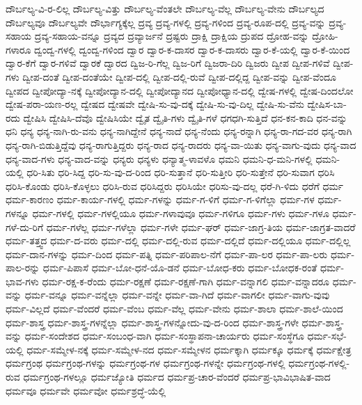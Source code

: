 {ದೌರ್ಬಲ್ಯ-ವಿ-ರ-ಲಿಲ್ಲ
ದೌರ್ಬಲ್ಯ-ವಿತ್ತು
ದೌರ್ಬಲ್ಯ-ವೆಂತಲೇ
ದೌರ್ಬಲ್ಯ-ವೆಲ್ಲ
ದೌರ್ಬಲ್ಯ-ವೇನು
ದೌರ್ಬಲ್ಯದ
ದೌರ್ಬಲ್ಯವೂ
ದೌರ್ಬಲ್ಯವೇ
ದೌರ್ಭಾಗ್ಯಕ್ಕೆಲ್ಲ
ದ್ರವ್ಯ
ದ್ರವ್ಯ-ಗಳಲ್ಲಿ
ದ್ರವ್ಯ-ಗಳಿಂದ
ದ್ರವ್ಯ-ರೂಪ-ದಲ್ಲಿ
ದ್ರವ್ಯ-ವನ್ನು
ದ್ರವ್ಯ-ಸಹಾಯ
ದ್ರವ್ಯ-ಸಹಾಯ-ವನ್ನೂ
ದ್ರವ್ಯದ
ದ್ರವ್ಯಾರ್ಜನೆ
ದ್ರಷ್ಟರು
ದ್ರಾಕ್ಷಿ
ದ್ರಾಕ್ಷಿಯ
ದ್ರುಪದ
ದ್ರೋಹ-ವನ್ನು
ದ್ರೋಹಿ-ಗಳಾರೂ
ದ್ವಂದ್ವ-ಗಳಲ್ಲಿ
ದ್ವಂದ್ವ-ಗಳಿಂದ
ದ್ವಾರ
ದ್ವಾರ-ಕ-ದಾಸರ
ದ್ವಾರ-ಕ-ದಾಸರು
ದ್ವಾರ-ಕೆ-ಯಲ್ಲಿ
ದ್ವಾರ-ಕೆ-ಯಿಂದ
ದ್ವಾರ-ಕೆಗೆ
ದ್ವಾರ-ಗಳಿವೆ
ದ್ವಾರಕೆ
ದ್ವಾರದ
ದ್ವಿಜ-ರಿ-ಗೆಲ್ಲ
ದ್ವಿಜ-ರಿಗೆ
ದ್ವಿಜರಾ-ದಿರಿ
ದ್ವಿಜರು
ದ್ವೀಪ
ದ್ವೀಪ-ಗಳಿವೆ
ದ್ವೀಪ-ಗಳು
ದ್ವೀಪ-ದಂತೆ
ದ್ವೀಪ-ದಂತೆಯೇ
ದ್ವೀಪ-ದಲ್ಲಿ
ದ್ವೀಪ-ದಲ್ಲಿ-ರುವೆ
ದ್ವೀಪ-ದಲ್ಲಿದ್ದ
ದ್ವೀಪ-ವನ್ನು
ದ್ವೀಪ-ವೆಂದೂ
ದ್ವೀಪದ
ದ್ವೀಪೋದ್ಯಾ-ನಕ್ಕೆ
ದ್ವೀಪೋದ್ಯಾನ-ದಲ್ಲಿ
ದ್ವೀಪೋದ್ಯಾನದ
ದ್ವೀಪೋಧ್ಯಾನ-ದಲ್ಲಿ
ದ್ವೇಷ-ಗಳಲ್ಲಿ
ದ್ವೇಷ-ದಿಂದಲೋ
ದ್ವೇಷ-ಪರಾ-ಯಣ-ರಲ್ಲ
ದ್ವೇಷದ
ದ್ವೇಷವೇ
ದ್ವೇಷಿ-ಸು-ವು-ದಕ್ಕೆ
ದ್ವೇಷಿ-ಸು-ವು-ದಿಲ್ಲ
ದ್ವೇಷಿ-ಸು-ವೆನು
ದ್ವೇಷಿಸ-ಬಾ-ರದು
ದ್ವೇಷಿಸಿ
ದ್ವೇಷಿಸಿ-ದೆವೊ
ದ್ವೇಷಿಸಿಯೇ
ದ್ವೈತ
ದ್ವೈತಿ-ಗಳು
ದ್ವೈತಿ-ಗಳೆ
ಧಗಧಗಿ-ಸುತ್ತಿದೆ
ಧನ-ಕನ-ಕಾದಿ
ಧನ-ವನ್ನು
ಧನಿ
ಧನ್ಯ
ಧನ್ಯ-ನಾಗಿ-ರು-ವನು
ಧನ್ಯ-ನಾಗಿದ್ದೇನೆ
ಧನ್ಯ-ನಾದೆ
ಧನ್ಯ-ನೆಂದು
ಧನ್ಯ-ರನ್ನಾಗಿ
ಧನ್ಯ-ರಾ-ಗದ-ವರ
ಧನ್ಯ-ರಾಗಿ
ಧನ್ಯ-ರಾಗಿ-ಬಿಡುತ್ತಿದ್ದೆವು
ಧನ್ಯ-ರಾಗುತ್ತಿದ್ದರು
ಧನ್ಯ-ರಾದ
ಧನ್ಯ-ರಾದರು
ಧನ್ಯ-ವಾ-ಯಿತು
ಧನ್ಯ-ವಾಗು-ವುದು
ಧನ್ಯ-ವಾದ
ಧನ್ಯ-ವಾದ-ಗಳು
ಧನ್ಯ-ವಾದ-ವನ್ನು
ಧನ್ಯರು
ಧನ್ಯಳು
ಧನ್ಯಾತ್ಮ-ಳಾವಳೊ
ಧಮನಿ
ಧಮನಿ-ಧ-ಮನಿ-ಗಳಲ್ಲಿ
ಧಮನಿ-ಯಲ್ಲಿ
ಧರಿ-ಸಿತು
ಧರಿ-ಸಿದ್ದ
ಧರಿ-ಸು-ವು-ದ-ರಿಂದ
ಧರಿ-ಸುತ್ತಾನೆ
ಧರಿ-ಸುತ್ತೀರಿ
ಧರಿ-ಸುತ್ತೇನೆ
ಧರಿ-ಸುವಾಗ
ಧರಿಸಿ
ಧರಿಸಿ-ಕೊಂಡು
ಧರಿಸಿ-ಕೊಳ್ಳಲು
ಧರಿಸಿ-ರುವ
ಧರಿಸಿದ್ದರು
ಧರಿಸಿಯೇ
ಧರಿಸು-ವು-ದಲ್ಲ
ಧರೆ-ಗಿ-ಳಿದು
ಧರೆಗೆ
ಧರ್ಮ
ಧರ್ಮ-ಕಾರಣಂ
ಧರ್ಮ-ಕಾರ್ಯ-ಗಳಲ್ಲಿ
ಧರ್ಮ-ಗಳನ್ನು
ಧರ್ಮ-ಗ-ಳಿಗೆ
ಧರ್ಮ-ಗ-ಳಿಗೆಲ್ಲಾ
ಧರ್ಮ-ಗಳ
ಧರ್ಮ-ಗಳನ್ನೂ
ಧರ್ಮ-ಗಳಲ್ಲಿ
ಧರ್ಮ-ಗಳಲ್ಲಿಯೂ
ಧರ್ಮ-ಗಳಾವುವೂ
ಧರ್ಮ-ಗಳಿಗೂ
ಧರ್ಮ-ಗಳು
ಧರ್ಮ-ಗಳೂ
ಧರ್ಮ-ಗಳೆ-ದು-ರಿಗೆ
ಧರ್ಮ-ಗಳೆಲ್ಲ
ಧರ್ಮ-ಗಳೆಲ್ಲಾ
ಧರ್ಮ-ಗಳೇ
ಧರ್ಮ-ಘರ್
ಧರ್ಮ-ಜಾಗ್ರ-ತಿಯ
ಧರ್ಮ-ಜಾಗ್ರತ-ವಾದರೆ
ಧರ್ಮ-ತತ್ತ್ವದ
ಧರ್ಮ-ದ-ವರು
ಧರ್ಮ-ದಲ್ಲಿ
ಧರ್ಮ-ದಲ್ಲಿ-ರುವ
ಧರ್ಮ-ದಲ್ಲಿದೆ
ಧರ್ಮ-ದಲ್ಲಿಯೂ
ಧರ್ಮ-ದಲ್ಲಿಲ್ಲ
ಧರ್ಮ-ದಾನ-ಗಳನ್ನು
ಧರ್ಮ-ದಿಂದ
ಧರ್ಮ-ಪತ್ನಿ
ಧರ್ಮ-ಪರಿಪಾಲ-ನೆಗೆ
ಧರ್ಮ-ಪಾ-ಲರ
ಧರ್ಮ-ಪಾ-ಲರು
ಧರ್ಮ-ಪಾಲ-ರನ್ನು
ಧರ್ಮ-ಪಿಪಾಸೆ
ಧರ್ಮ-ಬೋ-ಧನೆ-ಯೊ-ಡನೆ
ಧರ್ಮ-ಬೋಧ-ಕರು
ಧರ್ಮ-ಬೋಧಕ-ರಂತೆ
ಧರ್ಮ-ಭಾವ-ಗಳು
ಧರ್ಮ-ರಕ್ಷ-ಕ-ರೆಂದು
ಧರ್ಮ-ರಕ್ಷಣೆ
ಧರ್ಮ-ರಕ್ಷಣೆ-ಗಾಗಿ
ಧರ್ಮ-ವನ್ನಾಗಲಿ
ಧರ್ಮ-ವನ್ನಾದರೂ
ಧರ್ಮ-ವನ್ನು
ಧರ್ಮ-ವನ್ನೂ
ಧರ್ಮ-ವನ್ನೆಲ್ಲಾ
ಧರ್ಮ-ವನ್ನೇ
ಧರ್ಮ-ವಾ-ಗಿದೆ
ಧರ್ಮ-ವಾಗಲೀ
ಧರ್ಮ-ವಾಗು-ವುವು
ಧರ್ಮ-ವಿಲ್ಲದೆ
ಧರ್ಮ-ವೆಂದರೆ
ಧರ್ಮ-ವೆಂಬ
ಧರ್ಮ-ವೆಲ್ಲ
ಧರ್ಮ-ವೇನು
ಧರ್ಮ-ಶಾಲಾ
ಧರ್ಮ-ಶಾಲೆ-ಯಿಂದ
ಧರ್ಮ-ಶಾಸ್ತ್ರ
ಧರ್ಮ-ಶಾಸ್ತ್ರ-ಗಳನ್ನೆಲ್ಲಾ
ಧರ್ಮ-ಶಾಸ್ತ್ರ-ಗಳನ್ನೋದು-ವು-ದ-ರಿಂದ
ಧರ್ಮ-ಶಾಸ್ತ್ರ-ಗಳೇ
ಧರ್ಮ-ಶಾಸ್ತ್ರ-ವನ್ನು
ಧರ್ಮ-ಸಂದೇಶದ
ಧರ್ಮ-ಸಂಬಂಧ-ವಾಗಿ
ಧರ್ಮ-ಸಂಸ್ಥಾಪನಾ-ಚಾರ್ಯರು
ಧರ್ಮ-ಸಂಸ್ಥೆಗೂ
ಧರ್ಮ-ಸಭೆ-ಯಲ್ಲಿ
ಧರ್ಮ-ಸಮ್ಮೇಳ-ನಕ್ಕೆ
ಧರ್ಮ-ಸಮ್ಮೇಳ-ನದ
ಧರ್ಮ-ಸಮ್ಮೇಳನ
ಧರ್ಮಕ್ಕಾಗಿ
ಧರ್ಮಕ್ಕೂ
ಧರ್ಮಕ್ಕೆ
ಧರ್ಮಕ್ಷೇತ್ರ
ಧರ್ಮಗ್ರಂಥ
ಧರ್ಮಗ್ರಂಥ-ಗಳನ್ನು
ಧರ್ಮಗ್ರಂಥ-ಗಳ
ಧರ್ಮಗ್ರಂಥ-ಗಳನ್ನೇ
ಧರ್ಮಗ್ರಂಥ-ಗಳಲ್ಲಿ
ಧರ್ಮಗ್ರಂಥ-ಗಳಲ್ಲಿ-ರುವ
ಧರ್ಮಗ್ರಂಥ-ಗಳಲ್ಲೂ
ಧರ್ಮಜ್ಯೋತಿ
ಧರ್ಮದ
ಧರ್ಮಪ್ರ-ಚಾರ-ವೆಂದರೆ
ಧರ್ಮಪ್ರ-ಭಾವಿಭಾಷಿತ-ವಾದ
ಧರ್ಮವೂ
ಧರ್ಮವೇ
ಧರ್ಮವೋ
ಧರ್ಮಶ್ರದ್ಧೆ-ಯೆಲ್ಲಿ
}
